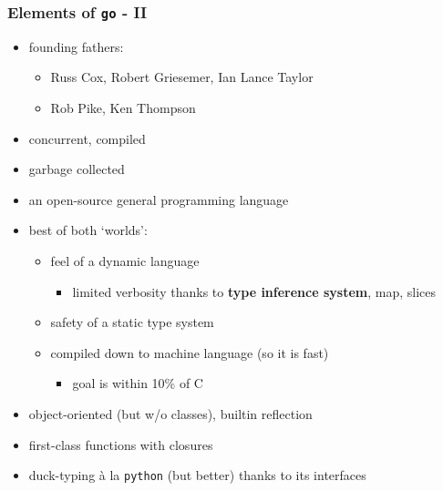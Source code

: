 \documentclass[9pt]{beamer}
\newcommand{\myred}  [1] {{\color{red}#1}}
\begin{document}
\begin{frame}
\frametitle{Elements of \verb~go~ - II}

\begin{itemize}
  \item founding fathers:
    \begin{itemize}
    \item Russ Cox, Robert Griesemer, Ian Lance Taylor
    \item Rob Pike, Ken Thompson
    \end{itemize}
  \item concurrent, compiled
  \item \alert{garbage collected}
  \item an open-source general programming language
  \item best of both `worlds':
    \begin{itemize}
    \item feel of a \alert{dynamic language}
      \begin{itemize}
      \item limited verbosity thanks to \textbf{type inference system}, map, slices
      \end{itemize}
    \item safety of a \alert{static type system}
    \item compiled down to machine language (so it is fast)
      \begin{itemize}
      \item goal is within 10\% of \alert{C}
      \end{itemize}
    \end{itemize}
  \item \alert{object-oriented} (but w/o classes), \alert{builtin reflection}
  \item first-class functions with \alert{closures}
  \item \myred{duck-typing} \`a la \texttt{python} (but better) thanks to its \myred{interfaces}
\end{itemize}
\end{frame}
\end{document}
